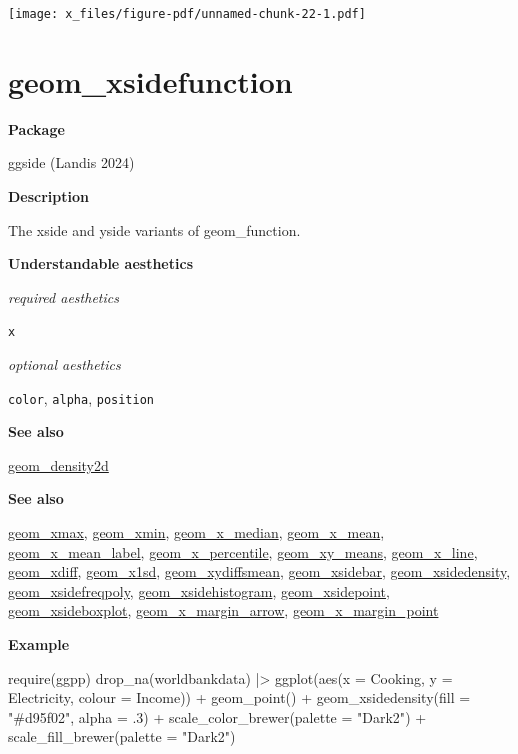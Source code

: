 \documentclass[
  letterpaper,
  DIV=11,
  numbers=noendperiod]{scrreprt}
\newenvironment{Shaded}{\begin{snugshade}}{\end{snugshade}}
\newcommand{\AttributeTok}[1]{\textcolor[rgb]{0.40,0.45,0.13}{#1}}
\newcommand{\DecValTok}[1]{\textcolor[rgb]{0.68,0.00,0.00}{#1}}
\newcommand{\FunctionTok}[1]{\textcolor[rgb]{0.28,0.35,0.67}{#1}}
\newcommand{\NormalTok}[1]{\textcolor[rgb]{0.00,0.23,0.31}{#1}}
\newcommand{\SpecialCharTok}[1]{\textcolor[rgb]{0.37,0.37,0.37}{#1}}
\newcommand{\StringTok}[1]{\textcolor[rgb]{0.13,0.47,0.30}{#1}}
\begin{document}
\texttt{[image: x\_files/figure-pdf/unnamed-chunk-22-1.pdf]}

\section{geom\_xsidefunction}\label{xsidefunction}

\textbf{Package}

ggside (Landis 2024)

\textbf{Description}

The xside and yside variants of geom\_function.

\textbf{Understandable aesthetics}

\emph{required aesthetics}

\texttt{x}

\emph{optional aesthetics}

\texttt{color}, \texttt{alpha}, \texttt{position}

\textbf{See also}

\href{@density2d}{geom\_density2d}

\textbf{See also}

\href{@xmax}{geom\_xmax}, \href{@xmin}{geom\_xmin},
\href{@x_median}{geom\_x\_median}, \href{@x_mean}{geom\_x\_mean},
\href{@x_mean_label}{geom\_x\_mean\_label},
\href{@x_percentile}{geom\_x\_percentile},
\href{@xy_means}{geom\_xy\_means}, \href{@x_line}{geom\_x\_line},
\href{@xdiff}{geom\_xdiff}, \href{@x1sd}{geom\_x1sd},
\href{@xydiffsmean}{geom\_xydiffsmean},
\href{@xsidebar}{geom\_xsidebar},
\href{@xsidedensity}{geom\_xsidedensity},
\href{@xsidefreqpoly}{geom\_xsidefreqpoly},
\href{@xsidehistogram}{geom\_xsidehistogram},
\href{@xsidepoint}{geom\_xsidepoint},
\href{@xsideboxplot}{geom\_xsideboxplot},
\href{@x_margin_arrow}{geom\_x\_margin\_arrow},
\href{@x_margin_point}{geom\_x\_margin\_point}

\textbf{Example}

\begin{Shaded}
\begin{Highlighting}[]
\FunctionTok{require}\NormalTok{(ggpp)}
\FunctionTok{drop\_na}\NormalTok{(worldbankdata) }\SpecialCharTok{|\textgreater{}}
\FunctionTok{ggplot}\NormalTok{(}\FunctionTok{aes}\NormalTok{(}\AttributeTok{x =}\NormalTok{ Cooking, }\AttributeTok{y =}\NormalTok{ Electricity, }\AttributeTok{colour =}\NormalTok{ Income)) }\SpecialCharTok{+}
  \FunctionTok{geom\_point}\NormalTok{() }\SpecialCharTok{+}
  \FunctionTok{geom\_xsidedensity}\NormalTok{(}\AttributeTok{fill =} \StringTok{"\#d95f02"}\NormalTok{, }\AttributeTok{alpha =}\NormalTok{ .}\DecValTok{3}\NormalTok{) }\SpecialCharTok{+} \FunctionTok{scale\_color\_brewer}\NormalTok{(}\AttributeTok{palette =} \StringTok{"Dark2"}\NormalTok{) }\SpecialCharTok{+} \FunctionTok{scale\_fill\_brewer}\NormalTok{(}\AttributeTok{palette =} \StringTok{"Dark2"}\NormalTok{)}
\end{Highlighting}
\end{Shaded}
\end{document}
